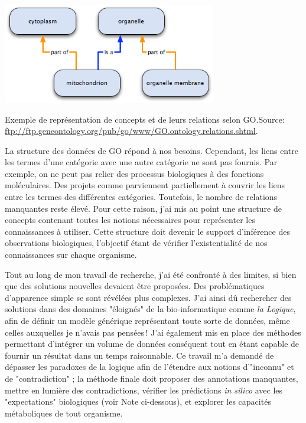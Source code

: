 \begin{refsegment}
\begin{shadedfigure}[H]
    \centering
    \includegraphics[width=0.7\textwidth]{img/dag_go_relation.png}
    \caption{Exemple de représentation de concepts et de leurs relations selon \gls{GO}.\hspace{\textwidth}\tiny{Source: \url{ftp://ftp.geneontology.org/pub/go/www/GO.ontology.relations.shtml}.}}
    \label{fig:go_relation}
\end{shadedfigure}


La structure des données de \gls{GO} répond à nos besoins. Cependant, les liens entre les termes d'une catégorie avec une autre catégorie ne sont pas fournis. Par exemple, on ne peut pas relier des processus biologiques à des fonctions moléculaires. Des projets comme \cite{AdditionalGO2006} parviennent partiellement à couvrir les liens  entre les termes des différentes catégories. Toutefois, le nombre de relations manquantes reste élevé. Pour cette raison, j'ai mis au point une structure de concepts contenant toutes les notions nécessaires pour représenter les connaissances à utiliser. Cette structure doit devenir le support d'inférence des observations biologiques, l'objectif étant de vérifier l'existentialité de nos connaissances sur chaque organisme.

Tout au long de mon travail de recherche, j'ai été confronté à des limites, si bien que des solutions nouvelles devaient être proposées. Des problématiques d'apparence simple se sont révélées plus complexes. J'ai ainsi dû rechercher des solutions dans des domaines "éloignés" de la bio-informatique comme \textit{la Logique}, afin de définir un modèle générique représentant toute sorte de données, même celles auxquelles je n'avais pas pensées ! J'ai également mis en place des méthodes permettant d'intégrer un volume de données conséquent tout en étant capable de fournir un résultat dans un temps raisonnable. Ce travail m'a demandé de dépasser les paradoxes de la logique afin de l'étendre aux notions d'"inconnu" et de "contradiction" ; la méthode finale doit proposer des annotations manquantes, mettre en lumière des contradictions, vérifier les prédictions \textit{in silico} avec les "expectations" biologiques (voir Note ci-dessous), et explorer les capacités métaboliques de tout organisme.


\end{refsegment}
